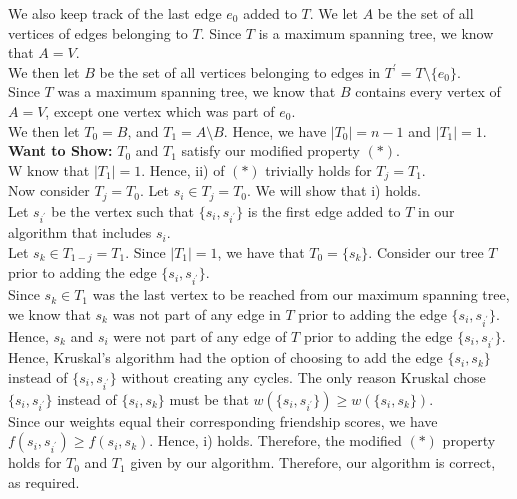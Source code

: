 \documentclass[12pt]{article}
\begin{document}
We also keep track of the last edge $e_0$ added to $T$. We let $A$ be the set of all vertices of edges belonging to $T$. Since $T$ is a maximum spanning tree, we know that $A = V$. \\

We then let $B$ be the set of all vertices belonging to edges in $T^\prime = T \setminus \{e_0\}$. \\

Since $T$ was a maximum spanning tree, we know that $B$ contains every vertex of $A = V$, except one vertex which was part of $e_0$. \\

We then let $T_0 = B$, and $T_1 = A \setminus B$. Hence, we have $|T_0| = n-1$ and $|T_1| = 1$. \\

\textbf{Want to Show:} $T_0$ and $T_1$ satisfy our modified property $(*)$. \\

W know that $|T_1| = 1$. Hence, ii) of $(*)$ trivially holds for $T_j = T_1$. \\

Now consider $T_j = T_0$. Let $s_i \in T_j = T_0$. We will show that i) holds. \\

Let $s_{i^\prime}$ be the vertex such that $\{s_i, s_{i^\prime}\}$ is the first edge added to $T$ in our algorithm that includes $s_i$. \\

Let $s_k \in T_{1-j} = T_1$. Since $|T_1| = 1$, we have that $T_0 = \{s_k\}$. Consider our tree $T$ prior to adding the edge $\{s_i, s_{i^\prime}\}$. \\

Since $s_k \in T_1$ was the last vertex to be reached from our maximum spanning tree, we know that $s_k$ was not part of any edge in $T$ prior to adding the edge $\{s_i, s_{i^\prime}\}$. \\

Hence, $s_k$ and $s_i$ were not part of any edge of $T$ prior to adding the edge $\{s_i, s_{i^\prime}\}$. Hence, Kruskal's algorithm had the option of choosing to add the edge $\{s_i, s_k\}$ instead of $\{s_i, s_{i^\prime}\}$ without creating any cycles. The only reason Kruskal chose $\{s_i, s_{i^\prime}\}$ instead of $\{s_i, s_k\}$ must be that $w(\{s_i, s_{i^\prime}\}) \geq w(\{s_i,s_k\})$. \\

Since our weights equal their corresponding friendship scores, we have $f(s_i, s_{i^\prime}) \geq f(s_i,s_k)$. Hence, i) holds. Therefore, the modified $(*)$ property holds for $T_0$ and $T_1$ given by our algorithm. Therefore, our algorithm is correct, as required. 
\end{document}
